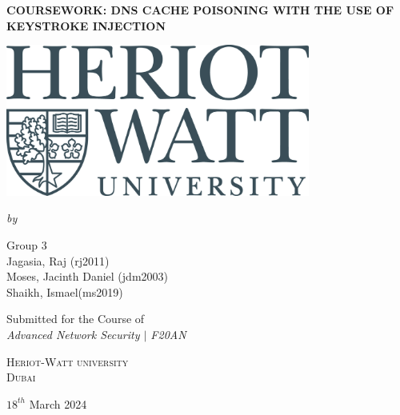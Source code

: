 \documentclass[11pt]{report}
\date{}
\begin{document}
\begin{titlepage}
    \begin{center}
    \begin{spacing}{1.8}
      {\Large\bfseries{COURSEWORK: DNS CACHE POISONING WITH THE USE OF KEYSTROKE INJECTION}}\\
    \end{spacing}
  
    \vspace{40pt}\par
    \includegraphics[width=10cm]{./Figures/HWUlogo.jpg}
    \vspace{40pt}\par
  
    {\itshape\fontsize{15.5pt}{15pt}\selectfont by\\}\vspace{15pt}\par
  
    {\Large Group 3\\[1em] Jagasia, Raj (rj2011) \\[0.5em] Moses, Jacinth Daniel (jdm2003) \\[0.5em] Shaikh, Ismael(ms2019)    \vspace{50pt}}
    
    {
    \large Submitted for the Course of \\ \vspace{5pt} \Large\slshape{Advanced Network Security $|$ F20AN}\\
    }
    
    \vspace{15pt}\par
    
    {\scshape{} Heriot-Watt university\\ Dubai}
    
    \vspace{25pt}\par
    
    
    {\large $18^{th}$ March 2024}
  \end{center}
\end{titlepage}
\newpage
\end{document}
